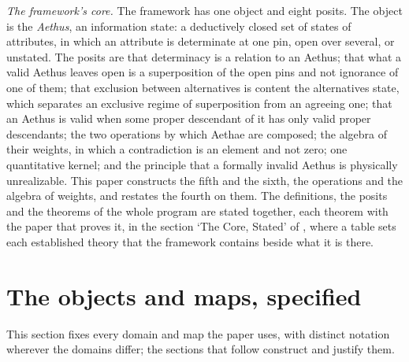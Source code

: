 \emph{The framework's core.} The framework has one object and eight posits. The object is the \emph{Aethus}, an information state: a deductively closed set of states of attributes, in which an attribute is determinate at one pin, open over several, or unstated. The posits are that determinacy is a relation to an Aethus; that what a valid Aethus leaves open is a superposition of the open pins and not ignorance of one of them; that exclusion between alternatives is content the alternatives state, which separates an exclusive regime of superposition from an agreeing one; that an Aethus is valid when some proper descendant of it has only valid proper descendants; the two operations by which Aethae are composed; the algebra of their weights, in which a contradiction is an element and not zero; one quantitative kernel; and the principle that a formally invalid Aethus is physically unrealizable. This paper constructs the fifth and the sixth, the operations and the algebra of weights, and restates the fourth on them. The definitions, the posits and the theorems of the whole program are stated together, each theorem with the paper that proves it, in the section `The Core, Stated' of \cite{AethusBrief}, where a table sets each established theory that the framework contains beside what it is there.

\section{The objects and maps, specified}\label{sec:spec}

\noindent This section fixes every domain and map the paper uses, with distinct notation wherever the domains differ; the sections that follow construct and justify them.

